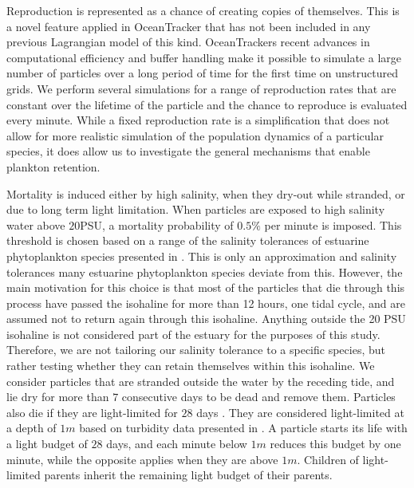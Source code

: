 \documentclass[npg, manuscript]{copernicus}
\begin{document}
Reproduction is represented as a chance of creating copies of themselves.
This is a novel feature applied in OceanTracker that has not been included in any previous Lagrangian model of this kind.
OceanTrackers recent advances in computational efficiency \citep{Vennell2021} and buffer handling make it possible to simulate a large number of particles over a long period of time for the first time on unstructured grids.
We perform several simulations for a range of reproduction rates that are constant over the lifetime of the particle and the chance to reproduce is evaluated every minute.
While a fixed reproduction rate is a simplification that does not allow for more realistic simulation of the population dynamics of a particular species, it does allow us to investigate the general mechanisms that enable plankton retention.

Mortality is induced either by high salinity, when they dry-out while stranded, or due to long term light limitation.
When particles are exposed to high salinity water above $20$PSU, a mortality probability of $0.5\%$ per minute is imposed.
This threshold is chosen based on a range of the salinity tolerances of estuarine phytoplankton species presented in \citep{vonAlvensleben2016}.
This is only an approximation and salinity tolerances many estuarine phytoplankton species deviate from this.
However, the main motivation for this choice is that most of the particles that die through this process have passed the isohaline for more than 12 hours, one tidal cycle, and are assumed not to return again through this isohaline.
Anything outside the 20 PSU isohaline is not considered part of the estuary for the purposes of this study.
Therefore, we are not tailoring our salinity tolerance to a specific species, but rather testing whether they can retain themselves within this isohaline.
We consider particles that are stranded outside the water by the receding tide, and lie dry for more than $7$ consecutive days to be dead and remove them.
Particles also die if they are light-limited for $28$ days \citep{Walter2017}.
They are considered light-limited at a depth of $1 \unit{m}$ based on turbidity data presented in \citep{Pein2021}.
A particle starts its life with a light budget of $28$ days, and each minute below $1 \unit{m}$ reduces this budget by one minute, while the opposite applies when they are above $1 \unit{m}$.
Children of light-limited parents inherit the remaining light budget of their parents.

\medskip
\end{document}
